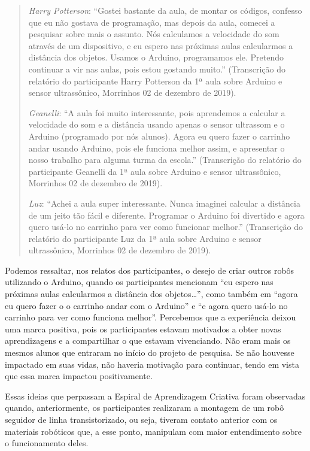 \documentclass{textolivre}
\begin{document}
\begin{quote}
\emph{Harry Potterson}: “Gostei bastante da aula, de montar os códigos, confesso que eu não gostava de programação, mas depois da aula, comecei a pesquisar sobre mais o assunto. Nós calculamos a velocidade do som através de um dispositivo, e eu espero nas próximas aulas calcularmos a distância dos objetos. Usamos o Arduino, programamos ele. Pretendo continuar a vir nas aulas, pois estou gostando muito.” (Transcrição do relatório do participante Harry Potterson da 1ª aula sobre Arduino e sensor ultrassônico, Morrinhos 02 de dezembro de 2019).

\emph{Geanelli}: “A aula foi muito interessante, pois aprendemos a calcular a velocidade do som e a distância usando apenas o sensor ultrassom e o Arduino (programado por nós alunos). Agora eu quero fazer o carrinho andar usando Arduino, pois ele funciona melhor assim, e apresentar o nosso trabalho para alguma turma da escola.” (Transcrição do relatório do participante Geanelli da 1ª aula sobre Arduino e sensor ultrassônico, Morrinhos 02 de dezembro de 2019).

\emph{Luz}: “Achei a aula super interessante. Nunca imaginei calcular a distância de um jeito tão fácil e diferente. Programar o Arduino foi divertido e agora quero usá-lo no carrinho para ver como funcionar melhor.” (Transcrição do relatório do participante Luz da 1ª aula sobre Arduino e sensor ultrassônico, Morrinhos 02 de dezembro de 2019).
\end{quote}

Podemos ressaltar, nos relatos dos participantes, o desejo de criar outros robôs utilizando o Arduino, quando os participantes mencionam “eu espero nas próximas aulas calcularmos a distância dos objetos…”, como também em “agora eu quero fazer o o carrinho andar com o Arduino” e “e agora quero usá-lo no carrinho para ver como funciona melhor”. Percebemos que a experiência deixou uma marca positiva, pois os participantes estavam motivados a obter novas aprendizagens e a compartilhar o que estavam vivenciando. Não eram mais os mesmos alunos que entraram no início do projeto de pesquisa. Se não houvesse impactado em suas vidas, não haveria motivação para continuar, tendo em vista que essa marca impactou positivamente.

Essas ideias que perpassam a Espiral de Aprendizagem Criativa foram observadas quando, anteriormente, os participantes realizaram a montagem de um robô seguidor de linha transistorizado, ou seja, tiveram contato anterior com os materiais robóticos que, a esse ponto, manipulam com maior entendimento sobre o funcionamento deles.
\end{document}
